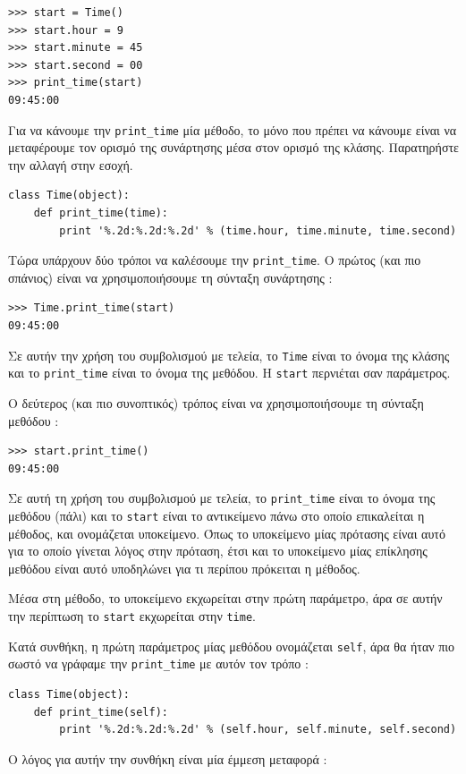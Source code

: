 \documentclass[10pt]{book}
\begin{document}
\begin{verbatim}
>>> start = Time()
>>> start.hour = 9
>>> start.minute = 45
>>> start.second = 00
>>> print_time(start)
09:45:00
\end{verbatim}
%
 Για να κάνουμε την  \verb"print_time"  μία μέθοδο, το μόνο που πρέπει να κάνουμε είναι να μεταφέρουμε τον ορισμό 
της συνάρτησης μέσα στον ορισμό της κλάσης.  Παρατηρήστε την αλλαγή στην εσοχή. 

\begin{verbatim}
class Time(object):
    def print_time(time):
        print '%.2d:%.2d:%.2d' % (time.hour, time.minute, time.second)
\end{verbatim}
%
 Τώρα υπάρχουν δύο τρόποι να καλέσουμε την  \verb"print_time".   Ο πρώτος (και πιο σπάνιος) είναι να χρησιμοποιήσουμε 
τη σύνταξη συνάρτησης :


\begin{verbatim}
>>> Time.print_time(start)
09:45:00
\end{verbatim}
%
 Σε αυτήν την χρήση του συμβολισμού με τελεία, το  {\tt Time}  είναι το όνομα της κλάσης και το  \verb"print_time"   είναι το όνομα της μεθόδου. Η  {\tt start}  περνιέται σαν παράμετρος.

Ο δεύτερος (και πιο συνοπτικός) τρόπος είναι να χρησιμοποιήσουμε τη σύνταξη μεθόδου :

\begin{verbatim}
>>> start.print_time()
09:45:00
\end{verbatim}
%
 Σε αυτή τη χρήση του συμβολισμού με τελεία, το  \verb"print_time"  είναι το όνομα της μεθόδου (πάλι) και το  {\tt start}  είναι το αντικείμενο πάνω στο οποίο επικαλείται η μέθοδος, και ονομάζεται υποκείμενο.  Όπως το υποκείμενο  μίας πρότασης είναι αυτό για το οποίο γίνεται λόγος στην πρόταση, έτσι και το υποκείμενο μίας επίκλησης μεθόδου είναι αυτό υποδηλώνει για τι περίπου πρόκειται η μέθοδος.

Μέσα στη μέθοδο, το υποκείμενο εκχωρείται στην πρώτη παράμετρο, άρα σε αυτήν την περίπτωση το  {\tt start}  εκχωρείται στην  {\tt time}.

 Κατά συνθήκη, η πρώτη παράμετρος μίας μεθόδου ονομάζεται  {\tt self},  άρα θα ήταν πιο σωστό να γράφαμε την  
\verb"print_time"  με αυτόν τον τρόπο :

\begin{verbatim}
class Time(object):
    def print_time(self):
        print '%.2d:%.2d:%.2d' % (self.hour, self.minute, self.second)
\end{verbatim}
%
 Ο λόγος για αυτήν την συνθήκη είναι μία έμμεση μεταφορά :
\end{document}

